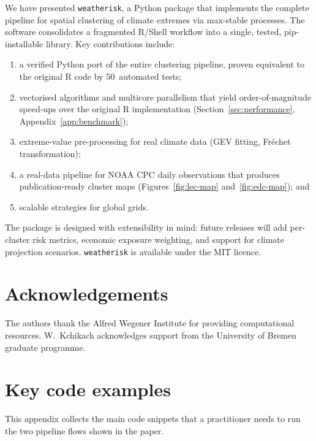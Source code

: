 \documentclass[preprint,12pt,a4paper]{elsarticle}
\begin{document}
We have presented \texttt{weatherisk}, a Python package that
implements the complete pipeline for spatial clustering of climate
extremes via max-stable processes.  The software consolidates a
fragmented R/Shell workflow into a single, tested, pip-installable
library.  Key contributions include:
\begin{enumerate}
\item a verified Python port of the entire clustering pipeline,
  proven equivalent to the original R code by 50~automated tests;
\item vectorised algorithms and multicore parallelism that yield
  order-of-magnitude speed-ups over the original R implementation
  (Section~\ref{sec:performance}, Appendix~\ref{app:benchmark});
\item extreme-value pre-processing for real climate data (GEV
  fitting, Fr\'{e}chet transformation);
\item a real-data pipeline for NOAA CPC daily observations that
  produces publication-ready cluster maps
  (Figures~\ref{fig:lec-map} and~\ref{fig:edc-map}); and
\item scalable strategies for global grids.
\end{enumerate}
The package is designed with extensibility in mind: future releases
will add per-cluster risk metrics, economic exposure weighting, and
support for climate projection scenarios.  \texttt{weatherisk} is
available under the MIT licence.

\section*{Acknowledgements}

The authors thank the Alfred Wegener Institute for providing
computational resources.  W.~Kchikach acknowledges support from
the University of Bremen graduate programme.

\appendix

\section{Key code examples}
\label{app:code}

This appendix collects the main code snippets that a practitioner
needs to run the two pipeline flows shown in the paper.
\end{document}
